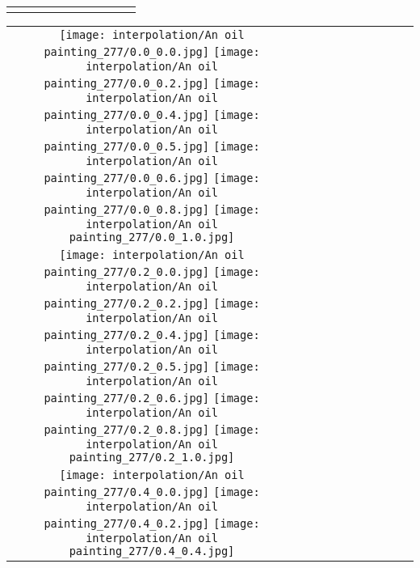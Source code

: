 \documentclass[10pt,twocolumn,letterpaper]{article}
\begin{document}
\begin{figure*}[tb!]
{\begin{tabular}{c c c c c c c c c c}
  \tabularnewline
\vspace{2mm}
\vspace{-2\baselineskip}
\end{tabular}}
\vspace{-0.8cm}
\hspace{20pt}
\label{fig:glideablation13}
\vspace{-2mm}
\end{figure*} \begin{figure*}[tb!]
    \centering
    \setlength{\tabcolsep}{0.5pt}
    {\small
    \renewcommand{\arraystretch}{0.5} 
    \begin{tabular}{c c c c c c c c c c}
    \captionsetup{type=figure, font=scriptsize}
    \raisebox{0.1in}{\rotatebox{90}{\small \emph{}
 }}
  \texttt{[image: interpolation/An oil painting\_277/0.0\_0.0.jpg]}
  \texttt{[image: interpolation/An oil painting\_277/0.0\_0.2.jpg]}
  \texttt{[image: interpolation/An oil painting\_277/0.0\_0.4.jpg]}
  \texttt{[image: interpolation/An oil painting\_277/0.0\_0.5.jpg]}
  \texttt{[image: interpolation/An oil painting\_277/0.0\_0.6.jpg]}
  \texttt{[image: interpolation/An oil painting\_277/0.0\_0.8.jpg]}
  \texttt{[image: interpolation/An oil painting\_277/0.0\_1.0.jpg]}
 \tabularnewline
     \raisebox{0.1in}{\rotatebox{90}{\small \emph{}
 }}
  \texttt{[image: interpolation/An oil painting\_277/0.2\_0.0.jpg]}
  \texttt{[image: interpolation/An oil painting\_277/0.2\_0.2.jpg]}
  \texttt{[image: interpolation/An oil painting\_277/0.2\_0.4.jpg]}
  \texttt{[image: interpolation/An oil painting\_277/0.2\_0.5.jpg]}
  \texttt{[image: interpolation/An oil painting\_277/0.2\_0.6.jpg]}
  \texttt{[image: interpolation/An oil painting\_277/0.2\_0.8.jpg]}
  \texttt{[image: interpolation/An oil painting\_277/0.2\_1.0.jpg]}
\tabularnewline
    \raisebox{0.1in}{\rotatebox{90}{\small \emph{}
 }}
  \texttt{[image: interpolation/An oil painting\_277/0.4\_0.0.jpg]}
  \texttt{[image: interpolation/An oil painting\_277/0.4\_0.2.jpg]}
  \texttt{[image: interpolation/An oil painting\_277/0.4\_0.4.jpg]}

\end{tabular}}
\end{figure*}
\end{document}
